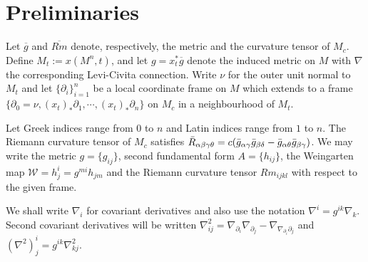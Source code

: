 \documentclass{amsart}
\begin{document}
\section{Preliminaries}
\label{sec:prelim}

Let $\overline{g}$ and $\overline{Rm}$ denote, respectively, the metric and the curvature tensor of $M_c$. Define \(M_t := x(M^n,t)\), and let \(g = x_t^{\ast} \overline{g}\) denote the induced metric on \(M\) with $\nabla$ the corresponding Levi-Civita connection. Write $\nu$ for the outer unit normal to $M_t$ and let \(\{\partial_i\}_{i=1}^n\) be a local coordinate frame on \(M\) which extends to a frame \(\{\partial_0 = \nu, (x_t)_{\ast} \partial_1, \cdots, (x_t)_{\ast} \partial_n\}\) on \(M_c\) in a neighbourhood of \(M_t\).

Let Greek indices range from \(0\) to \(n\) and Latin indices range from \(1\) to \(n\). The Riemann curvature tensor of \(M_c\) satisfies \(\bar{R}_{\alpha\beta\gamma\theta} = c(\bar{g}_{\alpha\gamma}\bar{g}_{\beta\delta} - \bar{g}_{\alpha\theta}\bar{g}_{\beta\gamma})\). We may write the metric $g = \{g_{ij}\}$, second fundamental form $A = \{h_{ij}\}$, the Weingarten map $\mathcal{W} = h^i_j = g^{mi} h_{jm}$ and the Riemann curvature tensor $Rm_{ijkl}$ with respect to the given frame.

We shall write \(\nabla_i\) for covariant derivatives and also use the notation \(\nabla^i = g^{ik} \nabla_k\). Second covariant derivatives will be written \(\nabla^2_{ij} = \nabla_{\partial_i} \nabla_{\partial_j} - \nabla_{\nabla_{\partial_i} \partial_j}\) and \((\nabla^2)^i_j = g^{ik} \nabla^2_{kj}\).
\end{document}
